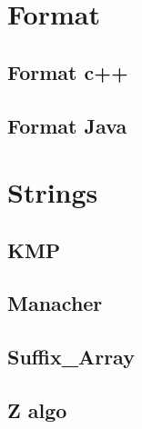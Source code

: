 \documentclass[12pt]{extarticle}
\author{
  Ankesh Gupta, Ronak Agarwal, Anant Chhajwani  
}
\begin{document}
\maketitle
\begin{multicols*}{2}
\setlength{\parskip}{0.0in}
\tableofcontents
\setlength{\parskip}{0.1in}
\section{Format}

\subsection{Format c++} %


\subsection{Format Java} %


\section{Strings}

\subsection{KMP} %


\subsection{Manacher}


\subsection{Suffix\_Array} %


\subsection{Z algo} %



\end{multicols*}
\end{document}
